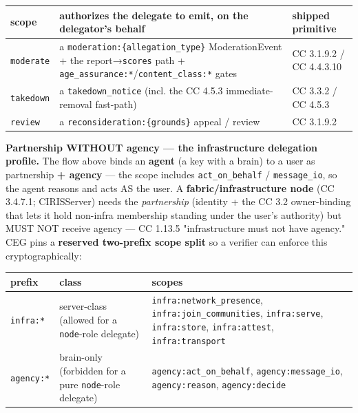 \documentclass[11pt]{article}
\begin{document}
{\footnotesize
\begin{longtable}{|p{5.33cm}|p{5.33cm}|p{5.33cm}|}\hline
\textbf{scope} & \textbf{authorizes the delegate to emit, on the delegator's behalf} & \textbf{shipped primitive} \\ \hline\endhead
\texttt{moderate} & a \texttt{moderation:\{allegation\_type\}} ModerationEvent + the report→\texttt{scores} path + \texttt{age\_assurance:*}/\texttt{content\_class:*} gates & CC 3.1.9.2 / CC 4.4.3.10 \\ \hline
\texttt{takedown} & a \texttt{takedown\_notice} (incl. the CC 4.5.3 immediate-removal fast-path) & CC 3.3.2 / CC 4.5.3 \\ \hline
\texttt{review} & a \texttt{reconsideration:\{grounds\}} appeal / review & CC 3.1.9.2 \\ \hline
\end{longtable}}



\textbf{Partnership WITHOUT agency — the infrastructure delegation profile.} The flow above binds an \textbf{agent} (a key with a brain) to a user as partnership \textbf{+ agency} — the scope includes \texttt{act\_on\_behalf} / \texttt{message\_io}, so the agent reasons and acts AS the user. A \textbf{fabric/infrastructure node} (CC 3.4.7.1; CIRISServer) needs the \textit{partnership} (identity + the CC 3.2 owner-binding that lets it hold non-infra membership standing under the user's authority) but MUST NOT receive agency — CC 1.13.5 "infrastructure must not have agency." CEG pins a \textbf{reserved two-prefix scope split} so a verifier can enforce this cryptographically:


{\footnotesize
\begin{longtable}{|p{5.33cm}|p{5.33cm}|p{5.33cm}|}\hline
\textbf{prefix} & \textbf{class} & \textbf{scopes} \\ \hline\endhead
\texttt{infra:*} & server-class (allowed for a \texttt{node}-role delegate) & \texttt{infra:network\_presence}, \texttt{infra:join\_communities}, \texttt{infra:serve}, \texttt{infra:store}, \texttt{infra:attest}, \texttt{infra:transport} \\ \hline
\texttt{agency:*} & brain-only (forbidden for a pure \texttt{node}-role delegate) & \texttt{agency:act\_on\_behalf}, \texttt{agency:message\_io}, \texttt{agency:reason}, \texttt{agency:decide} \\ \hline
\end{longtable}}
\end{document}
